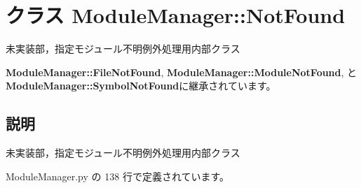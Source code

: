 \section{クラス ModuleManager::NotFound}
\label{classsource__py_1_1_module_manager_1_1_module_manager_1_1_not_found}
未実装部，指定モジュール不明例外処理用内部クラス  


{\bf ModuleManager::FileNotFound}, {\bf ModuleManager::ModuleNotFound}, と {\bf ModuleManager::SymbolNotFound}に継承されています。



\subsection{説明}
未実装部，指定モジュール不明例外処理用内部クラス 

 ModuleManager.py の 138 行で定義されています。